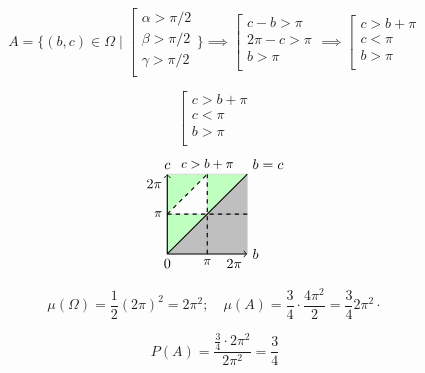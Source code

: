 \begin{enumerate}
	$$
	A = \{ (b,c) \in \Omega \;|\;
	\left[\begin{array}{c}
		\alpha > \pi/2 \\
		\beta > \pi/2 \\
		\gamma > \pi/2 \\
	\end{array}\right. \} \implies
	\left[\begin{array}{c}
		c-b > \pi \\
		2\pi - c > \pi \\
		b > \pi \\
	\end{array}\right. \implies
	\left[\begin{array}{c}
		c > b + \pi \\
		c < \pi \\
		b > \pi \\
	\end{array}\right.
	$$
	\pagebreak
	\begin{multicols}{2}
		$$
		\left[\begin{array}{c}
			c > b + \pi \\
			c < \pi \\
			b > \pi \\
		\end{array}\right.
		$$
		\columnbreak
		$$
		\begin{tikzpicture}
			\filldraw[fill=green!25, draw=black!0] (0,1) -- (0,2) -- (1,2) -- cycle;
			\filldraw[fill=green!25, draw=black!0] (0,0) -- (0,1) -- (1,1) -- cycle;
			\filldraw[fill=green!25, draw=black!0] (1,1) -- (1,2) -- (2,2) -- cycle;
			\filldraw[fill=black!25, draw=black!0] (0,0) -- (2,2) -- (2,0) -- cycle;
			\draw[step=1cm,gray,very thin] (0,0) grid (2,2);
			\draw[thick,->] (0,0) node[anchor=north] {$0$} -- (2,0) node[anchor=west] {$b$} node[anchor=north east] {$2\pi$};
			\draw[thick,->] (0,0) -- (0,2) node[anchor=south] {$c$} node[anchor=north east] {$2\pi$};
			\draw[thick] (0,0) -- (2,2) node[above right] {$b=c$};
			\draw[thick, dashed] (1,0) node[below] {\small $\pi$} -- (1,2); 
			\draw[thick, dashed] (0,1) node[left] {\small $\pi$} -- (2,1); 
			\draw[thick, dashed] (0,1) -- (1,2) node[above] {\small $c > b + \pi$}; 
		\end{tikzpicture}
		$$
	\end{multicols}

	$$\mu(\Omega) = \frac{1}{2} (2\pi)^2 = 2\pi^2;\quad
	\mu(A) = \frac{3}{4} \cdot \frac{4\pi^2}{2} = \frac{3}{4} 2\pi^2 \cdot $$
	\begin{mdframed}[style=ans]
		$$P(A) = \frac{\frac{3}{4} \cdot 2\pi^2}{2\pi^2} = \frac{3}{4} $$
	\end{mdframed}


\end{enumerate}
